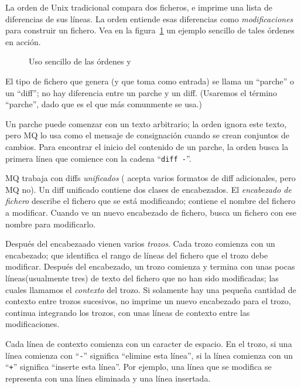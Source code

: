 La orden de Unix tradicional  compara dos ficheros, e
imprime una lista de diferencias de sus líneas.  La orden
 entiende esas diferencias como \emph{modificaciones}
para construir un fichero.  Vea en la figura~\ref{ex:mq:diff} un
ejemplo sencillo de tales órdenes en acción.

\begin{figure}[ht]
  \caption{Uso sencillo de las órdenes  y }
  \label{ex:mq:diff}
\end{figure}

El tipo de fichero que  genera (y que 
toma como entrada) se llama un ``parche'' o un ``diff''; no hay
diferencia entre un parche y un diff.  (Usaremos el término ``parche'',
dado que es el que más comunmente se usa.)

Un parche puede comenzar con un texto arbitrario; la orden 
ignora este texto, pero MQ lo usa como el mensaje de consignación
cuando se crean conjuntos de cambios.  Para encontrar el inicio del
contenido de un parche, la orden  busca la primera
línea que comience con la cadena ``\texttt{diff~-}''.

MQ trabaja con diffs \emph{unificados} ( acepta varios
formatos de diff adicionales, pero MQ no).  Un diff unificado contiene
dos clases de encabezados.  El \emph{encabezado de fichero} describe
el fichero que se está modificando; contiene el nombre del fichero a
modificar.  Cuando  ve un nuevo encabezado de fichero,
busca un fichero con ese nombre para modificarlo.

Después del encabezaado vienen varios \emph{trozos}.  Cada trozo
comienza con un encabezado; que identifica el rango de líneas del
fichero que el trozo debe modificar.  Después del encabezado, un trozo
comienza y termina con unas pocas líneas(usualmente tres) de texto del
fichero que no han sido modificadas; las cuales llamamos el
\emph{contexto} del trozo.  Si solamente hay una pequeña cantidad de
contexto entre trozos sucesivos,  no imprime un nuevo
encabezado para el trozo, continua integrando los trozos, con unas
líneas de contexto entre las modificaciones.

Cada línea de contexto comienza con un caracter de espacio.  En el
trozo, si una línea comienza con ``\texttt{-}'' significa ``elimine
esta línea'', si la línea comienza con un ``\texttt{+}'' significa
``inserte esta línea''.  Por ejemplo, una línea que se modifica se
representa con una línea eliminada y una línea insertada.

